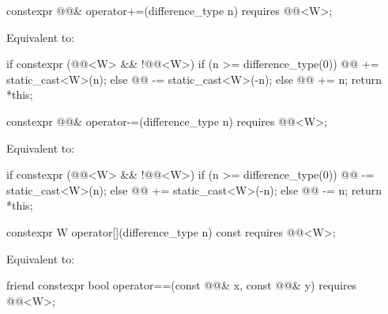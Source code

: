 \begin{itemdecl}
constexpr @@& operator+=(difference_type n)
  requires @@<W>;
\end{itemdecl}

\begin{itemdescr}
\pnum
\effects
Equivalent to:
\begin{codeblock}
if constexpr (@@<W> && !@@<W>) {
  if (n >= difference_type(0))
    @@ += static_cast<W>(n);
  else
    @@ -= static_cast<W>(-n);
} else {
  @@ += n;
}
return *this;
\end{codeblock}
\end{itemdescr}

\begin{itemdecl}
constexpr @@& operator-=(difference_type n)
  requires @@<W>;
\end{itemdecl}

\begin{itemdescr}
\pnum
\effects
Equivalent to:
\begin{codeblock}
if constexpr (@@<W> && !@@<W>) {
  if (n >= difference_type(0))
    @@ -= static_cast<W>(n);
  else
    @@ += static_cast<W>(-n);
} else {
  @@ -= n;
}
return *this;
\end{codeblock}
\end{itemdescr}

\begin{itemdecl}
constexpr W operator[](difference_type n) const
  requires @@<W>;
\end{itemdecl}

\begin{itemdescr}
\pnum
\effects
Equivalent to: 
\end{itemdescr}

\begin{itemdecl}
friend constexpr bool operator==(const @@& x, const @@& y)
  requires @@<W>;
\end{itemdecl}

